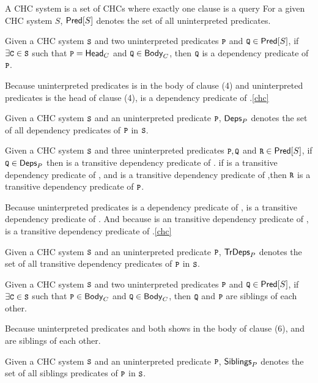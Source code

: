 A CHC system is a set of CHCs where exactly one clause is a query
%
For a given CHC system $S$, $\mathsf{Pred}[ S ]$ denotes the set of all
uninterpreted predicates.

\begin{defn}
  Given a CHC system $\cc{S}$ and two uninterpreted predicates $\cc{P}$ and
  $\cc{Q} \in \predof{S}$, if $\exists \cc{C} \in \cc{S}$ such that $\cc{P} = \headof{C}$
  and $\cc{Q} \in \bodyof{C}$, then $\cc{Q}$ is a dependency predicate of $\cc{P}$.
\end{defn}
%
\begin{ex}
  Because uninterpreted predicates  is in the body of clause (4) and uninterpreted predicates 
  is the head of clause (4),  is a dependency predicate of .\autoref{chc}
\end{ex}
%
Given a CHC system $\cc{S}$ and an uninterpreted predicate $\cc{P}$, $\mathsf{Deps}_{P}$
denotes the set of all dependency predicates of $\cc{P}$ in $\cc{S}$.
%

\begin{defn}
  Given a CHC system $\cc{S}$ and three uninterpreted predicates $\cc{P},
  \cc{Q}$ and $\cc{R} \in \predof{S}$, if $\cc{Q} \in \depsof{P}$ then  is a transitive dependency
  predicate of . 
  if  is a transitive dependency predicate of , and  is a transitive dependency predicate
  of ,then $\cc{R}$ is a transitive dependency predicate of $\cc{P}$.
\end{defn}
%
\begin{ex}
  Because uninterpreted predicates  is a dependency predicate of , 
   is a transitive dependency predicate of .
  And because  is an transitive dependency predicate of , 
   is a transitive dependency predicate of .\autoref{chc}
\end{ex}
%
Given a CHC system $\cc{S}$ and an uninterpreted predicate $\cc{P}$, $\mathsf{TrDeps}_{P}$
denotes the set of all transitive dependency predicates of $\cc{P}$ in $\cc{S}$.
%

\begin{defn}
  Given a CHC system $\cc{S}$ and two uninterpreted predicates $\cc{P}$ and
  $\cc{Q} \in \predof{S}$, if $\exists \cc{C} \in \cc{S}$ such that $\cc{P} \in \bodyof{C}$
  and $\cc{Q} \in \bodyof{C}$, then $\cc{Q}$ and $\cc{P}$ are siblings of each other.
\end{defn}
%
\begin{ex}
  Because uninterpreted predicates  and  both shows in the body of
  clause (6),  and  are siblings of each other.
\end{ex}
%
Given a CHC system $\cc{S}$ and an uninterpreted predicate $\cc{P}$, $\mathsf{Siblings}_{P}$
denotes the set of all siblings predicates of $\cc{P}$ in $\cc{S}$.
%

